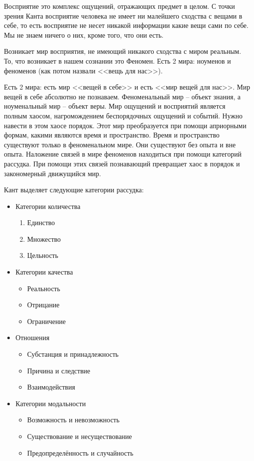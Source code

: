 Восприятие это комплекс ощущений, отражающих предмет в целом. С точки зрения Канта восприятие человека не имеет ни малейшего сходства с вещами в себе, то есть восприятие не несет никакой информации какие вещи сами по себе. Мы не знаем ничего о них, кроме того, что они есть.

    Возникает мир восприятия, не имеющий никакого сходства с миром реальным. То, что возникает в нашем сознании это Феномен. Есть 2 мира: ноуменов и феноменов (как потом назвали <<вещь для нас>>).

Есть 2 мира: есть мир <<вещей в себе>> и есть <<мир вещей для нас>>. Мир вещей в себе абсолютно не познаваем. Феноменальный мир – объект знания, а ноуменальный мир – объект веры. Мир ощущений и восприятий является полным хаосом, нагромождением беспорядочных ощущений и событий. Нужно навести в этом хаосе порядок. Этот мир преобразуется при помощи априорными формам, какими являются время и пространство. Время и пространство существуют только в феноменальном мире. Они существуют без опыта и вне опыта. Наложение связей в мире феноменов находиться при помощи категорий рассудка. При помощи этих связей познавающий превращает хаос в порядок и закономерный движущийся мир.

Кант выделяет следующие категории рассудка: 
\begin{itemize}
    \item Категории количества
    \begin{enumerate}
        \item Единство
        \item Множество
        \item Цельность
    \end{enumerate}
    \item Категории качества
    
    \begin{itemize}
        \item Реальность
        \item Отрицание
        \item Ограничение
    \end{itemize}

    \item Отношения

    \begin{itemize}
        \item Субстанция и принадлежность
        \item Причина и следствие
        \item Взаимодействия
    \end{itemize}

    \item Категории модальности

    \begin{itemize}
        \item Возможность и невозможность
        \item Существование и несуществование
        \item Предопределённость и случайность
    \end{itemize}

\end{itemize}


